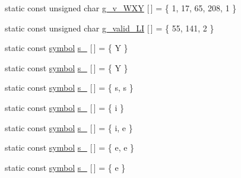 \begin{DoxyCompactItemize}
static const unsigned char \mbox{\hyperlink{namespaceirk_1_1porter2_a4ad0268645cfe48bb4655d16c40f7e16}{g\+\_\+v\+\_\+\+W\+XY}} \mbox{[}$\,$\mbox{]} = \{ 1, 17, 65, 208, 1 \}
\item 
static const unsigned char \mbox{\hyperlink{namespaceirk_1_1porter2_a0f8f2be6fdbd456ca961a19f73f9f699}{g\+\_\+valid\+\_\+\+LI}} \mbox{[}$\,$\mbox{]} = \{ 55, 141, 2 \}
\item 
static const \mbox{\hyperlink{namespaceirk_1_1porter2_afd04c4eb58a1dabcf8f3ab2d7e9f9ed5}{symbol}} \mbox{\hyperlink{namespaceirk_1_1porter2_adb4e36add3337ace26b30fa5498d793b}{s\+\_}} \mbox{[}$\,$\mbox{]} = \{ \textquotesingle{}Y\textquotesingle{} \}
\item 
static const \mbox{\hyperlink{namespaceirk_1_1porter2_afd04c4eb58a1dabcf8f3ab2d7e9f9ed5}{symbol}} \mbox{\hyperlink{namespaceirk_1_1porter2_ae181ebff2d844d2e5ed20f6510580499}{s\+\_}} \mbox{[}$\,$\mbox{]} = \{ \textquotesingle{}Y\textquotesingle{} \}
\item 
static const \mbox{\hyperlink{namespaceirk_1_1porter2_afd04c4eb58a1dabcf8f3ab2d7e9f9ed5}{symbol}} \mbox{\hyperlink{namespaceirk_1_1porter2_a5249d2df14080e2b9cc06bd70947936b}{s\+\_}} \mbox{[}$\,$\mbox{]} = \{ \textquotesingle{}s\textquotesingle{}, \textquotesingle{}s\textquotesingle{} \}
\item 
static const \mbox{\hyperlink{namespaceirk_1_1porter2_afd04c4eb58a1dabcf8f3ab2d7e9f9ed5}{symbol}} \mbox{\hyperlink{namespaceirk_1_1porter2_ab5c2ac405e182a4a3c74494fd3c94f5f}{s\+\_}} \mbox{[}$\,$\mbox{]} = \{ \textquotesingle{}i\textquotesingle{} \}
\item 
static const \mbox{\hyperlink{namespaceirk_1_1porter2_afd04c4eb58a1dabcf8f3ab2d7e9f9ed5}{symbol}} \mbox{\hyperlink{namespaceirk_1_1porter2_a0e773cbda434598dfde4b95a80aea9a8}{s\+\_}} \mbox{[}$\,$\mbox{]} = \{ \textquotesingle{}i\textquotesingle{}, \textquotesingle{}e\textquotesingle{} \}
\item 
static const \mbox{\hyperlink{namespaceirk_1_1porter2_afd04c4eb58a1dabcf8f3ab2d7e9f9ed5}{symbol}} \mbox{\hyperlink{namespaceirk_1_1porter2_a71ceb0d1286accd7f14ab3f64cc91bb1}{s\+\_}} \mbox{[}$\,$\mbox{]} = \{ \textquotesingle{}e\textquotesingle{}, \textquotesingle{}e\textquotesingle{} \}
\item 
static const \mbox{\hyperlink{namespaceirk_1_1porter2_afd04c4eb58a1dabcf8f3ab2d7e9f9ed5}{symbol}} \mbox{\hyperlink{namespaceirk_1_1porter2_a5c3d367f7a2ee5317bb4ecea860a8557}{s\+\_}} \mbox{[}$\,$\mbox{]} = \{ \textquotesingle{}e\textquotesingle{} \}
\item 

\end{DoxyCompactItemize}
